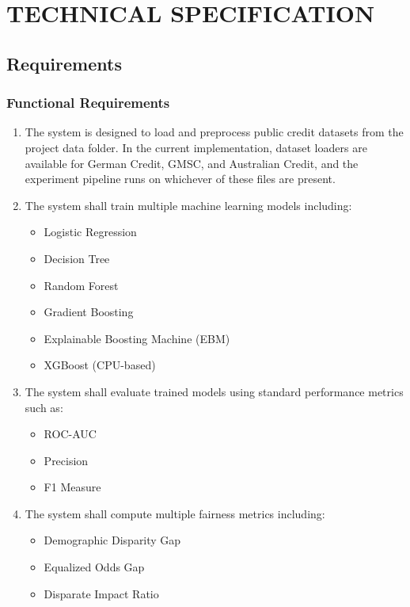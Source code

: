 \chapter{\MakeUppercase{Technical Specification}}

\section{Requirements}

\subsection{Functional Requirements}

\begin{enumerate}
    \item[FR1.] The system is designed to load and preprocess public credit datasets from the project data folder. In the current implementation, dataset loaders are available for German Credit, GMSC, and Australian Credit, and the experiment pipeline runs on whichever of these files are present.

    \item[FR2.] The system shall train multiple machine learning models including:
    \begin{itemize}
        \item Logistic Regression
        \item Decision Tree
        \item Random Forest
        \item Gradient Boosting
        \item Explainable Boosting Machine (EBM)
        \item XGBoost (CPU-based)
    \end{itemize}

    \item[FR3.] The system shall evaluate trained models using standard performance metrics such as:
    \begin{itemize}
        \item ROC-AUC
        \item Precision
        \item F1 Measure
    \end{itemize}

    \item[FR4.] The system shall compute multiple fairness metrics including:
    \begin{itemize}
        \item Demographic Disparity Gap
        \item Equalized Odds Gap
        \item Disparate Impact Ratio
    \end{itemize}


\end{enumerate}
